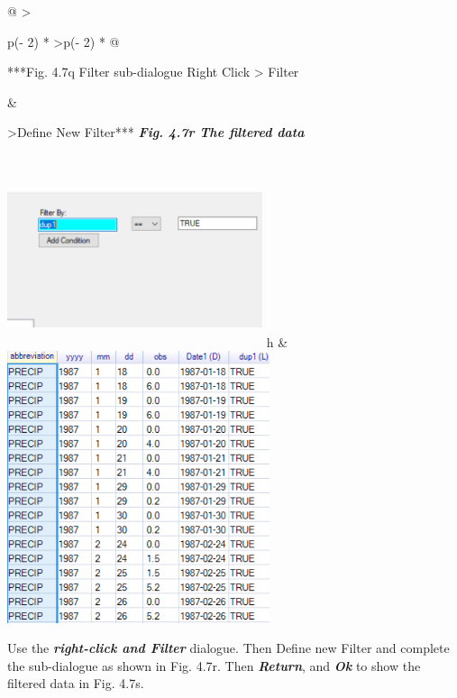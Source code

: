 \documentclass[
  letterpaper,
  DIV=11,
  numbers=noendperiod]{scrreprt}
\begin{document}
\begin{longtable}[]{@{}
  >{\raggedright\arraybackslash}p{(\columnwidth - 2\tabcolsep) * }
  >{\raggedleft\arraybackslash}p{(\columnwidth - 2\tabcolsep) * }@{}}
\toprule\noalign{}
\begin{minipage}[b]{\linewidth}\raggedright
***Fig. 4.7q Filter sub-dialogue Right Click \textgreater{} Filter
\end{minipage} & \begin{minipage}[b]{\linewidth}\raggedleft
\textgreater Define New Filter*** \textbf{\emph{Fig. 4.7r The filtered
data}}
\end{minipage} \\
\midrule\noalign{}
\endhead
\bottomrule\noalign{}
\endlastfoot
\includegraphics[width=2.94966in,height=2.02184in]{figures/Fig4.7r.png}
h &
\includegraphics[width=3.03407in,height=\textheight]{figures/Fig4.7s.png} \\
\end{longtable}

Use the \textbf{\emph{right-click and Filter}} dialogue. Then Define new
Filter and complete the sub-dialogue as shown in Fig. 4.7r. Then
\textbf{\emph{Return}}, and \textbf{\emph{Ok}} to show the filtered data
in Fig. 4.7s.
\end{document}
